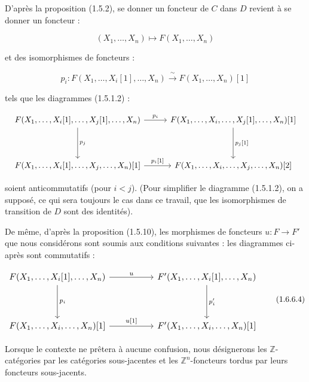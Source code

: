 %
D'après la proposition (1.5.2), se donner un foncteur de $C$ dans
$D$ revient à se donner un foncteur :

\begin{equation}
  (X_1,\ldots,X_n)\longmapsto F(X_1,\ldots,X_n)
  \tag{1.6.6.2}
\end{equation}

et des isomorphismes de foncteurs :

\begin{equation}
  p_i\colon
  F(X_1,\ldots,X_i[1],\ldots,X_n)
  \xrightarrow{\ \sim\ }
  F(X_1,\ldots,X_n)[1]
  \tag{1.6.6.3}
\end{equation}

tels que les diagrammes (1.5.1.2) :

\begin{equation*}
  \resizebox{\textwidth}{!}{%
    $\begin{tikzcd}[ampersand replacement=\&,column sep=2.8em,row sep=3.8em]
      F(X_1,\ldots,X_i[1],\ldots,X_j[1],\ldots,X_n)
        \arrow[r,"{p_i}"]
        \arrow[d,"{p_j}"]
        \& F(X_1,\ldots,X_i,\ldots,X_j[1],\ldots,X_n)[1]
          \arrow[d,"{p_j[1]}"] \\
      F(X_1,\ldots,X_i[1],\ldots,X_j,\ldots,X_n)[1]
        \arrow[r,"{p_i[1]}"]
        \& F(X_1,\ldots,X_i,\ldots,X_j,\ldots,X_n)[2]
    \end{tikzcd}$%
  }
\end{equation*}

soient anticommutatifs (pour $i<j$). (Pour simplifier le diagramme
(1.5.1.2), on a supposé, ce qui sera toujours le cas dans ce travail,
que les isomorphismes de transition de $D$ sont des identités).

De même, d'après la proposition (1.5.10), les morphismes de foncteurs
$u\colon F\longrightarrow F'$ que nous considérons sont soumis aux
conditions suivantes : les diagrammes ci-après sont commutatifs :

\begin{equation}
  \resizebox{0.92\textwidth}{!}{%
    $\begin{tikzcd}[ampersand replacement=\&,column sep=5.0em,row sep=3.8em]
      F(X_1,\ldots,X_i[1],\ldots,X_n)
        \arrow[r,"u"]
        \arrow[d,"{p_i}"]
        \& F'(X_1,\ldots,X_i[1],\ldots,X_n)
          \arrow[d,"{p'_i}"] \\
      F(X_1,\ldots,X_i,\ldots,X_n)[1]
        \arrow[r,"{u[1]}"]
        \& F'(X_1,\ldots,X_i,\ldots,X_n)[1]
    \end{tikzcd}$%
  }
  \tag{1.6.6.4}
\end{equation}

Lorsque le contexte ne prêtera à aucune confusion, nous désignerons les
$\mathbb Z$-catégories par les catégories sous-jacentes et les
$\mathbb Z^n$-foncteurs tordus par leurs foncteurs sous-jacents.
